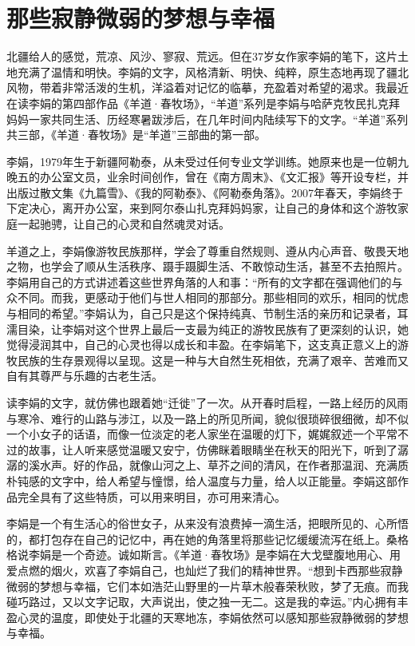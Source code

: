 \documentclass[11pt,twoside,openany,x11names,svgnames]{memoir}
\begin{document}
\section{那些寂静微弱的梦想与幸福}
北疆给人的感觉，荒凉、风沙、寥寂、荒远。但在37岁女作家李娟的笔下，这片土地充满了温情和明快。李娟的文字，风格清新、明快、纯粹，原生态地再现了疆北风物，带着非常活泼的生机，洋溢着对记忆的临摹，充盈着对希望的渴求。我最近在读李娟的第四部作品《羊道·春牧场》，“羊道”系列是李娟与哈萨克牧民扎克拜妈妈一家共同生活、历经寒暑跋涉后，在几年时间内陆续写下的文字。“羊道”系列共三部，《羊道·春牧场》是“羊道”三部曲的第一部。

李娟，1979年生于新疆阿勒泰，从未受过任何专业文学训练。她原来也是一位朝九晚五的办公室文员，业余时间创作，曾在《南方周末》、《文汇报》等开设专栏，并出版过散文集《九篇雪》、《我的阿勒泰》、《阿勒泰角落》。2007年春天，李娟终于下定决心，离开办公室，来到阿尔泰山扎克拜妈妈家，让自己的身体和这个游牧家庭一起驰骋，让自己的心灵和自然魂灵对话。

羊道之上，李娟像游牧民族那样，学会了尊重自然规则、遵从内心声音、敬畏天地之物，也学会了顺从生活秩序、蹑手蹑脚生活、不敢惊动生活，甚至不去拍照片。李娟用自己的方式讲述着这些世界角落的人和事：“所有的文字都在强调他们的与众不同。而我，更感动于他们与世人相同的那部分。那些相同的欢乐，相同的忧虑与相同的希望。”李娟认为，自己只是这个保持纯真、节制生活的亲历和记录者，耳濡目染，让李娟对这个世界上最后一支最为纯正的游牧民族有了更深刻的认识，她觉得浸润其中，自己的心灵也得以成长和丰盈。在李娟笔下，这支真正意义上的游牧民族的生存景观得以呈现。这是一种与大自然生死相依，充满了艰辛、苦难而又自有其尊严与乐趣的古老生活。

读李娟的文字，就仿佛也跟着她“迁徙”了一次。从开春时启程，一路上经历的风雨与寒冷、难行的山路与涉江，以及一路上的所见所闻，貌似很琐碎很细微，却不似一个小女子的话语，而像一位淡定的老人家坐在温暖的灯下，娓娓叙述一个平常不过的故事，让人听来感觉温暖又安宁，仿佛眯着眼睛坐在秋天的阳光下，听到了潺潺的溪水声。好的作品，就像山河之上、草芥之间的清风，在作者那温润、充满质朴钝感的文字中，给人希望与憧憬，给人温度与力量，给人以正能量。李娟这部作品完全具有了这些特质，可以用来明目，亦可用来清心。

李娟是一个有生活心的俗世女子，从来没有浪费掉一滴生活，把眼所见的、心所悟的，都打包存在自己的记忆中，再在她的角落里将那些记忆缓缓流泻在纸上。桑格格说李娟是一个奇迹。诚如斯言。《羊道·春牧场》是李娟在大戈壁腹地用心、用爱点燃的烟火，欢喜了李娟自己，也灿烂了我们的精神世界。“想到卡西那些寂静微弱的梦想与幸福，它们本如浩茫山野里的一片草木般春荣秋败，梦了无痕。而我碰巧路过，又以文字记取，大声说出，使之独一无二。这是我的幸运。”内心拥有丰盈心灵的温度，即使处于北疆的天寒地冻，李娟依然可以感知那些寂静微弱的梦想与幸福。
\end{document}
